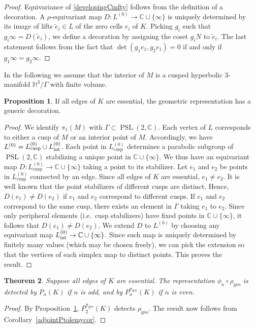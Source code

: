 \documentclass[11pt]{amsart}
\newtheorem{theorem}{Theorem}[section]
\theoremstyle{definition}
\newtheorem{proposition}[theorem]{Proposition}
\numberwithin{equation}{section}
\DeclareMathOperator{\PSL}{PSL}
\DeclareMathOperator{\geo}{geo}
\DeclareMathOperator{\cusp}{cusp}
\newcommand{\C}{\mathbb C}
\renewcommand{\H}{\mathbb H}
\newcommand{\Cinfty}{\C\cup\{\infty\}}
\begin{document}
\begin{proof}
Equivariance of \eqref{developingCinfty} follows from the definition of a 
decoration. A $\rho$-equivariant map $D\colon L^{(0)}\to\Cinfty$ is uniquely 
determined by its image of lifts $\widetilde e_i\in L$ of the zero cells 
$e_i$ of $K$. Picking $g_i$ such that $g_i\infty=D(\widetilde e_i)$, we 
define a decoration by assigning the coset $g_iN$ to $\widetilde e_i$. 
The last statement follows from the fact that $\det(g_1e_1,g_2e_1)=0$ if 
and only if $g_1\infty=g_2\infty$.
\end{proof}

In the following we assume that the interior of $M$ is a cusped hyperbolic $3$-manifold $\H^3/\Gamma$ with finite volume.
\begin{proposition}\label{detectsgeometric}
If all edges of $K$ are essential, 
the geometric representation has a generic decoration.
\end{proposition}

\begin{proof}
We identify $\pi_1(M)$ with $\Gamma\subset\PSL(2,\C)$. Each vertex of $L$ 
corresponds to either a cusp of $M$ or an interior point of $M$. Accordingly, 
we have $L^{(0)}=L^{(0)}_{\cusp}\cup L^{(0)}_{\textnormal{int}}$. 
Each point in $L^{(0)}_{\cusp}$ determines a parabolic subgroup of $\PSL(2,\C)$ 
stabilizing a unique point in $\C\cup\{\infty\}$. We thus have an equivariant 
map $D\colon L^{(0)}_{\cusp}\to \C\cup\{\infty\}$ taking a point to its 
stabilizer. Let $e_1$ and $e_2$ be points in $L^{(0)}_{\cusp}$ connected by an 
edge. Since all edges of $K$ are essential, $e_1\neq e_2$. It is well known 
that the point stabilizers of different cusps are distinct. Hence, 
$D(e_1)\neq D(e_2)$ if $e_1$ and $e_2$ correspond to different cusps. If 
$e_1$ and $e_2$ correspond to the same cusp, there exists an element in 
$\Gamma$ taking $e_1$ to $e_2$. Since only peripheral elements (i.e.~cusp 
stabilizers) have fixed points in $\Cinfty$, it follows that 
$D(e_1)\neq D(e_2)$. We extend $D$ to $L^{(0)}$ by choosing any equivariant 
map $L^{(0)}_{\textnormal{int}}\to\C\cup\{\infty\}$. Since such map is uniquely 
determined by finitely many values (which may be chosen freely), we can 
pick the extension so that the vertices of each simplex map to distinct 
points. This proves the result. 
\end{proof}

\begin{theorem}\label{Ptolemydetectsrhogeoproof} Suppose all edges of $K$ are essential. The representation $\phi_n\circ\rho_{\geo}$ is detected by $P_n(K)$ if $n$ is odd, and by $P_n^{\sigma_{\geo}}(K)$ if $n$ is even.
\end{theorem} 
\begin{proof}
By Proposition~\ref{detectsgeometric}, $P_2^{\sigma_{\geo}}(K)$ detects $\rho_{\geo}$. The result now follows from Corollary~\ref{adjointPtolemycor}.
\end{proof}
\end{document}
